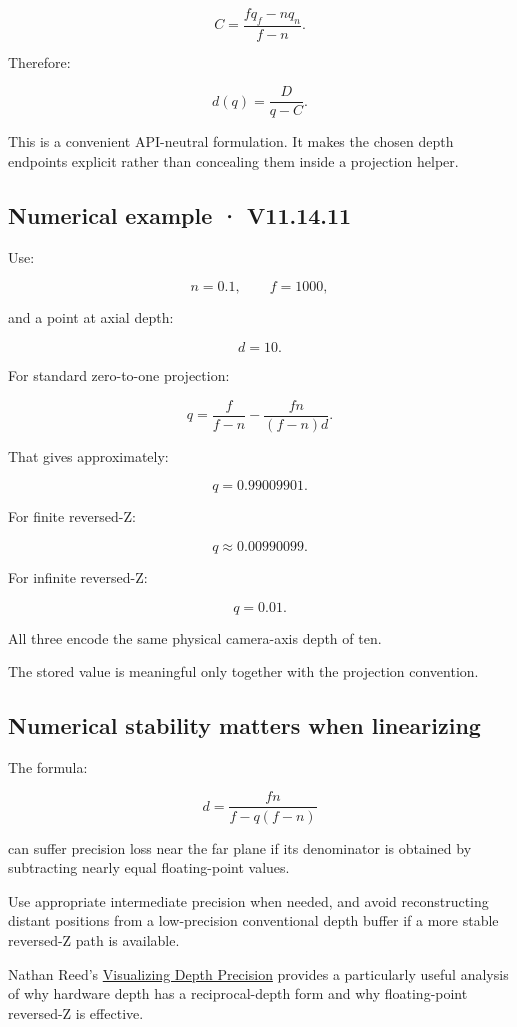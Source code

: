 \[ \boxed{ C=\frac{fq_f-nq_n}{f-n}. } \]

Therefore:

\[ \boxed{ d(q)=\frac D{q-C}. } \]

This is a convenient API-neutral formulation. It makes the chosen depth endpoints explicit rather than concealing them inside a projection helper.

\subsection{Numerical example · V11.14.11}\label{02-foundations-ii-ch035-numerical-example-v11.14.11}

Use:

\[ n=0.1,\qquad f=1000, \]

and a point at axial depth:

\[ d=10. \]

For standard zero-to-one projection:

\[ q=\frac f{f-n}-\frac{fn}{(f-n)d}. \]

That gives approximately:

\[ \boxed{q=0.99009901}. \]

For finite reversed-Z:

\[ \boxed{q\approx0.00990099}. \]

For infinite reversed-Z:

\[ \boxed{q=0.01}. \]

All three encode the same physical camera-axis depth of ten.

The stored value is meaningful only together with the projection convention.

\subsection{Numerical stability matters when linearizing}\label{02-foundations-ii-ch035-numerical-stability-matters-when-linearizing}

The formula:

\[ d=\frac{fn}{f-q(f-n)} \]

can suffer precision loss near the far plane if its denominator is obtained by subtracting nearly equal floating-point values.

Use appropriate intermediate precision when needed, and avoid reconstructing distant positions from a low-precision conventional depth buffer if a more stable reversed-Z path is available.

Nathan Reed's \href{https://developer.nvidia.com/blog/visualizing-depth-precision/?utm_source=chatgpt.com}{Visualizing Depth Precision} provides a particularly useful analysis of why hardware depth has a reciprocal-depth form and why floating-point reversed-Z is effective. 

